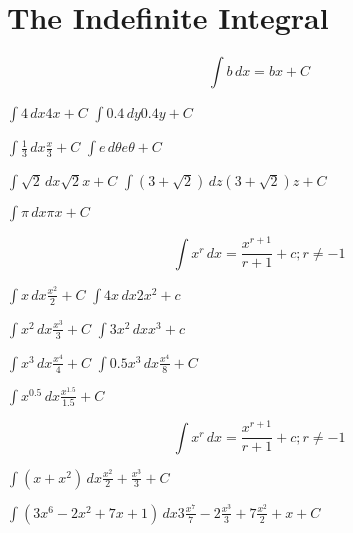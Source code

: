 
\section{The Indefinite Integral}

\begin{myframe}[arc=10pt,auto outer arc]
\[ \int b \,dx = bx + C
\]
\end{myframe}

\pairofprobsans%
{$\displaystyle \int 4 \,dx$}{$4x + C$}%
{$\displaystyle \int 0.4 \,dy$}{$0.4y + C$}%

\pairofprobsans%
{$\displaystyle \int \frac{1}{3} \,dx$}{$\displaystyle \frac{x}{3} + C$}%
{$\displaystyle \int e \,d\theta$}{$\displaystyle e \theta +C$}%

\pairofprobsans%
{$\displaystyle \int \sqrt{2} \,dx$}{$\displaystyle \sqrt{2}x + C$}%
{$\displaystyle \int (3 + \sqrt{2}) \,dz$}{$\displaystyle (3 + \sqrt{2})z + C$}%

\problemans%
{$\displaystyle \int \pi \,dx$}{$\pi x +C$}%

\newpage
\begin{myframe}[arc=10pt,auto outer arc]
	\[ \int x^r \,dx = \frac{x^{r+1}}{r + 1} + c; r\ne -1
	\]
\end{myframe}

\pairofprobsans%
{$\displaystyle \int x \,dx$}{$\displaystyle \frac{x^2}{2} + C$}%
{$\displaystyle \int 4x \,dx$}{$2x^2 + c$}%

\pairofprobsans%
{$\displaystyle \int x^2 \,dx$}{$\displaystyle \frac{x^3}{3} + C$}%
{$\displaystyle \int 3x^2 \,dx$}{$x^3 + c$}%

\pairofprobsans%
{$\displaystyle \int x^3 \,dx$}{$\displaystyle \frac{x^4}{4} + C$}%
{$\displaystyle \int 0.5x^3 \,dx$}{$\displaystyle \frac{x^4}{8} + C$}%

\problemans%
{$\displaystyle \int x^{0.5} \,dx$}{$\displaystyle \frac{x^{1.5}}{1.5} + C$}%


\newpage
\begin{myframe}[arc=10pt,auto outer arc]
	\[ \int x^r \,dx = \frac{x^{r+1}}{r + 1} + c; r\ne -1
	\]
\end{myframe}

\problemans%
{$\displaystyle \int (x + x^2) \,dx$}{$\displaystyle \frac{x^2}{2} + \frac{x^3}{3} + C$}%

\problemans%
{$\displaystyle \int (3x^6 - 2x^2 + 7x + 1) \,dx$}{$\displaystyle 3\frac{x^7}{7} - 2\frac{x^3}{3} + 7\frac{x^2}{2} + x + C$}%

